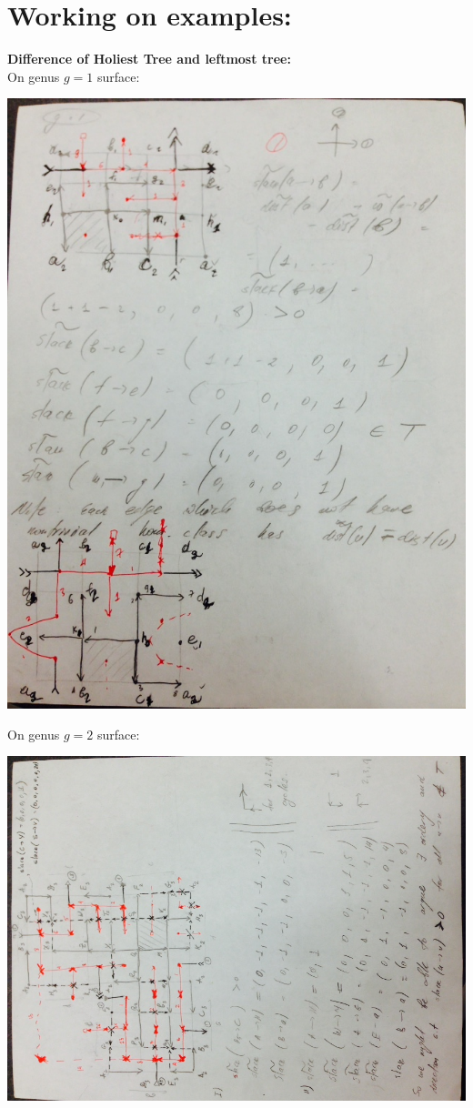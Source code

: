 \documentclass{article}
\begin{document}
\newpage
\section{Working on examples:}
\textbf{Difference of Holiest Tree and leftmost tree:} \\
On genus $g = 1$ surface:
\begin{center}
\includegraphics[scale = 0.6]{genus1.jpg}
\end{center}




\newpage
On genus $g = 2$ surface:
\begin{center}
\includegraphics[angle = -90, scale = 0.7]{genus2.jpg}
\end{center}
\end{document}
